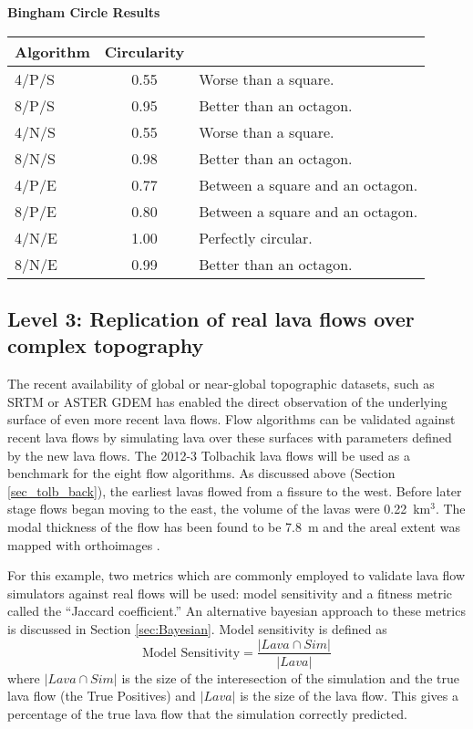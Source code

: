 		\begin{center}
			\textbf{Bingham Circle Results}\\
			\begin{tabular}{l c l}
				\toprule
				Algorithm&Circularity&\\
				\midrule
				4/P/S & 0.55 & Worse than a square.\\
				8/P/S & 0.95 & Better than an octagon.\\
				4/N/S & 0.55 & Worse than a square.\\
				8/N/S & 0.98 & Better than an octagon.\\
				4/P/E & 0.77 & Between a square and an octagon.\\
				8/P/E & 0.80 & Between a square and an octagon.\\
				4/N/E & 1.00 & Perfectly circular.\\
				8/N/E & 0.99 & Better than an octagon.\\
				
				\bottomrule
			\end{tabular}
		\end{center}
		
	\subsection{Level 3: Replication of real lava flows over complex topography}\label{sec_tolb_bench}
		The recent availability of global or near-global topographic datasets, such as SRTM or ASTER GDEM has enabled the direct observation of the underlying surface of even more recent lava flows. Flow algorithms can be validated against recent lava flows by simulating lava over these surfaces with parameters defined by the new lava flows. The 2012-3 Tolbachik lava flows will be used as a benchmark for the eight flow algorithms. As discussed above (Section \ref{sec_tolb_back}), the earliest lavas flowed from a fissure to the west. Before later stage flows began moving to the east, the volume of the lavas were 0.22~km$^3$. The modal thickness of the flow has been found to be 7.8~m and the areal extent was mapped with orthoimages \citep{kubanek2015lava}.

		For this example, two metrics which are commonly employed to validate lava flow simulators against real flows will be used: model sensitivity and a fitness metric called the ``Jaccard coefficient.'' An alternative bayesian approach to these metrics is discussed in Section \ref{sec:Bayesian}.  Model sensitivity is defined as
		\begin{equation}
			\text{Model~Sensitivity}=\frac{|Lava\cap Sim|}{|Lava|}
		\label{eq_sensitivity}
		\end{equation}
		where $|Lava\cap Sim|$ is the size of the interesection of the simulation and the true lava flow (the True Positives) and $|Lava|$ is the size of the lava flow. This gives a percentage of the true lava flow that the simulation correctly predicted. 
		
